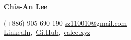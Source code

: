 \documentclass[letterpaper,11pt]{article}
\begin{document}
  


    
    
  
\begin{center}
    \textbf{{\Huge Chia-An Lee}}\\
    \vspace{0.5em}
    
    \color{black}(+886) 905-690-190
    \color{blue}\href{mailto:sz110010@gmail.com}{sz110010@gmail.com}\\
    \color{blue}\href{https://www.linkedin.com/in/calee0219/}{LinkedIn}\color{black}$,$ \color{blue}\href{https://github.com/calee0219}{GitHub}\color{black}$,$ \color{blue}\href{https://calee.xyz/}{calee.xyz}
\end{center}
\vspace{-1em}

\end{document}
